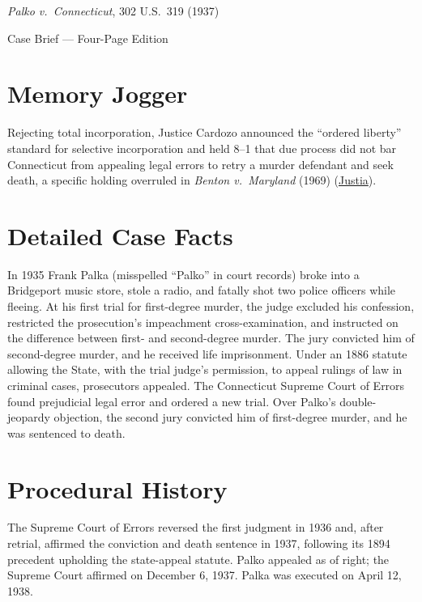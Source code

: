 \documentclass[12pt]{article}
\begin{document}
\begin{center}
{\LARGE \textit{Palko v.\ Connecticut}, 302 U.S.\ 319 (1937)\par}
\vspace{0.8em}
{\large Case Brief --- Four-Page Edition\par}
\end{center}
\vspace{1em}

\section{Memory Jogger}

Rejecting total incorporation, Justice Cardozo announced the ``ordered liberty'' standard for selective incorporation and held 8--1 that due process did not bar Connecticut from appealing legal errors to retry a murder defendant and seek death, a specific holding overruled in \textit{Benton v.\ Maryland} (1969) (\href{https://supreme.justia.com/cases/federal/us/302/319/}{Justia}).

\section{Detailed Case Facts}

In 1935 Frank Palka (misspelled ``Palko'' in court records) broke into a Bridgeport music store, stole a radio, and fatally shot two police officers while fleeing. At his first trial for first-degree murder, the judge excluded his confession, restricted the prosecution's impeachment cross-examination, and instructed on the difference between first- and second-degree murder. The jury convicted him of second-degree murder, and he received life imprisonment. Under an 1886 statute allowing the State, with the trial judge's permission, to appeal rulings of law in criminal cases, prosecutors appealed. The Connecticut Supreme Court of Errors found prejudicial legal error and ordered a new trial. Over Palko's double-jeopardy objection, the second jury convicted him of first-degree murder, and he was sentenced to death.

\section{Procedural History}

The Supreme Court of Errors reversed the first judgment in 1936 and, after retrial, affirmed the conviction and death sentence in 1937, following its 1894 precedent upholding the state-appeal statute. Palko appealed as of right; the Supreme Court affirmed on December 6, 1937. Palka was executed on April 12, 1938.
\end{document}
